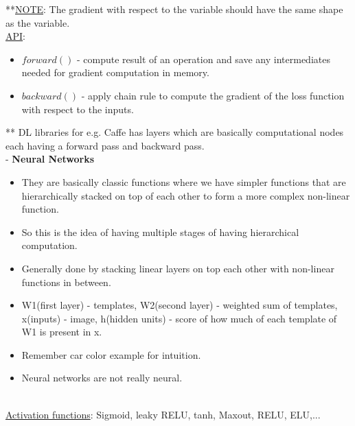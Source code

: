 \documentclass[twoside]{article}
\begin{document}
**\underline{NOTE}: The gradient with respect to the variable should have the same shape as the variable.
\\

\underline{API}: 
\begin{itemize}
    \item $forward()$ - compute result of an operation and save any intermediates needed for gradient computation in memory.
    \item $backward()$ - apply chain rule to compute the gradient of the loss function with respect to the inputs.
\end{itemize}


** DL libraries for e.g. Caffe has layers which are basically computational nodes each having a forward pass and backward pass.
\\

- \textbf{Neural Networks}

\begin{itemize}
    \item They are basically classic functions where we have simpler functions that are hierarchically stacked on top of each other to form a more complex non-linear function.
    \item So this is the idea of having multiple stages of having hierarchical computation.
    \item Generally done by stacking linear layers on top each other with non-linear functions in between.
    \item W1(first layer) - templates, W2(second layer) - weighted sum of templates,  x(inputs) - image, h(hidden units) - score of how much of each template of W1 is present in x.
    \item Remember car color example for intuition.
    \item Neural networks are not really neural.
\end{itemize}
\\
\underline{Activation functions}: Sigmoid, leaky RELU, tanh, Maxout, RELU, ELU,...

\end{document}
